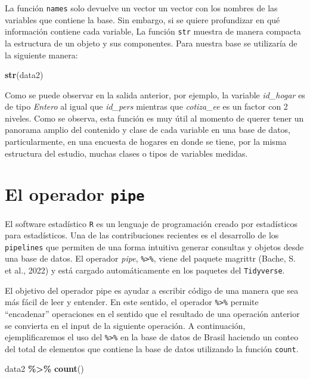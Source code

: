 \documentclass[
  12pt,
]{book}
\newenvironment{Shaded}{\begin{snugshade}}{\end{snugshade}}
\newcommand{\FunctionTok}[1]{\textcolor[rgb]{0.13,0.29,0.53}{\textbf{#1}}}
\newcommand{\NormalTok}[1]{#1}
\newcommand{\SpecialCharTok}[1]{\textcolor[rgb]{0.81,0.36,0.00}{\textbf{#1}}}
\begin{document}
La función \texttt{names} solo devuelve un vector un vector con los nombres de las variables que contiene la base. Sin embargo, si se quiere profundizar en qué información contiene cada variable, La función \texttt{str} muestra de manera compacta la estructura de un objeto y sus componentes. Para nuestra base se utilizaría de la siguiente manera:

\begin{Shaded}
\begin{Highlighting}[]
\FunctionTok{str}\NormalTok{(data2)}
\end{Highlighting}
\end{Shaded}

Como se puede observar en la salida anterior, por ejemplo, la variable \emph{id\_hogar} es de tipo \emph{Entero} al igual que \emph{id\_pers} mientras que \emph{cotiza\_ee} es un factor con 2 niveles. Como se observa, esta función es muy útil al momento de querer tener un panorama amplio del contenido y clase de cada variable en una base de datos, particularmente, en una encuesta de hogares en donde se tiene, por la misma estructura del estudio, muchas clases o tipos de variables medidas.

\section{\texorpdfstring{El operador \texttt{pipe}}{El operador pipe}}\label{el-operador-pipe}

El software estadístico \texttt{R} es un lenguaje de programación creado por estadísticos para estadísticos. Una de las contribuciones recientes es el desarrollo de los \texttt{pipelines} que permiten de una forma intuitiva generar consultas y objetos desde una base de datos. El operador \emph{pipe}, \texttt{\%\textgreater{}\%}, viene del paquete magrittr (Bache, S. et al., 2022) y está cargado automáticamente en los paquetes del \texttt{Tidyverse}.

El objetivo del operador pipe es ayudar a escribir código de una manera que sea más fácil de leer y entender. En este sentido, el operador \texttt{\%\textgreater{}\%} permite ``encadenar'' operaciones en el sentido que el resultado de una operación anterior se convierta en el input de la siguiente operación. A continuación, ejemplificaremos el uso del \texttt{\%\textgreater{}\%} en la base de datos de Brasil haciendo un conteo del total de elementos que contiene la base de datos utilizando la función \texttt{count}.

\begin{Shaded}
\begin{Highlighting}[]
\NormalTok{data2 }\SpecialCharTok{\%\textgreater{}\%} \FunctionTok{count}\NormalTok{()}
\end{Highlighting}
\end{Shaded}
\end{document}
